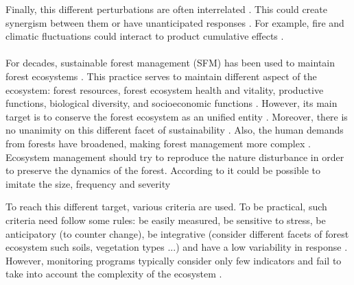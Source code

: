 \documentclass{article}
\begin{document}
Finally, this different perturbations are often interrelated \cite{keane2015exploring}. This could create synergism between them \cite{mandre_environmental_2011} or have unanticipated responses \cite{perera2015simulation}. For example, fire and climatic fluctuations could interact to product cumulative effects \cite{romme2009historical}.



\paragraph{}
For decades, sustainable forest management (SFM) has been used to maintain forest ecosystems \cite{macdicken2015global}. 
This practice serves to maintain different aspect of the ecosystem: forest resources, forest ecosystem health and vitality, productive functions, biological diversity, and socioeconomic functions \cite{makela_using_2012}. 
However, its main target is to conserve the forest ecosystem as an unified entity \cite{franklin1989toward}.
Moreover, there is no unanimity on this different facet of sustainability \cite{martinez-vega_assessing_2016}.
 Also, the human demands from forests have broadened, making forest management more complex \cite{eggers2017balancing}. Ecosystem management should try to reproduce the nature disturbance \cite{bengston_changing_1994} \cite{bengtsson2000biodiversity} in order to preserve the dynamics of the forest. 
 According to \cite{hunter1990wildlife} \cite{hunter1988paleoecology} it could be possible to imitate the size, frequency and severity

To reach this different target, various criteria are used. 
To be practical, such criteria need follow some rules: be easily measured, be sensitive to stress, be anticipatory (to counter change), be integrative (consider different facets of forest ecosystem such soils, vegetation types ...) and have a low variability in response \cite{dale2001challenges}. However, monitoring programs typically consider only few indicators and fail to take into account the complexity of the ecosystem \cite{dale2001challenges}.
\end{document}
